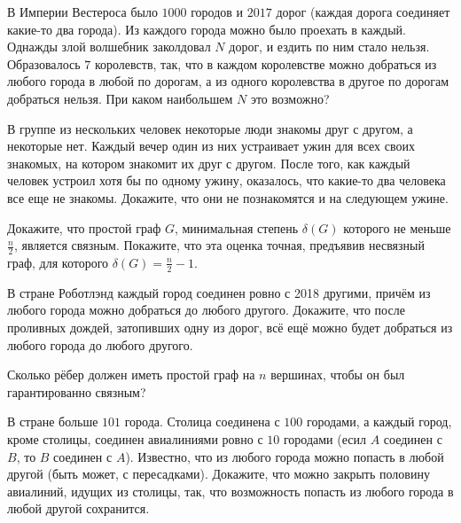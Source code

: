 \begin{exersize}
	В Империи Вестероса было $1000$ городов и $2017$ дорог (каждая дорога соединяет какие-то два города). Из каждого города можно 
	было проехать в каждый. Однажды злой волшебник заколдовал $N$ дорог, и ездить по ним стало нельзя. Образовалось $7$ королевств, 
	так, что в каждом королевстве можно добраться из любого города в любой по дорогам, а из одного королевства в другое по дорогам 
	добраться нельзя. При каком наибольшем $N$ это возможно?
\end{exersize}

\begin{exersize}
	В группе из нескольких человек некоторые люди знакомы друг с другом, а некоторые нет. Каждый вечер один из них устраивает 
	ужин для всех своих знакомых, на котором знакомит их друг с другом. После того, как каждый человек устроил хотя бы по одному ужину, 
	оказалось, что какие-то два человека все еще не знакомы. Докажите, что они не познакомятся и на следующем ужине.
\end{exersize}

\begin{exersize}
	Докажите, что простой граф $G$, минимальная степень $\delta (G)$ которого не меньше $\frac{n}{2}$, является связным. 
	Покажите, что эта оценка точная, предъявив несвязный граф, для которого $\delta (G) = \frac{n}{2} - 1$.
\end{exersize}

\begin{exersize}
	В стране Роботлэнд каждый город соединен ровно с 2018 другими, причём из любого города можно добраться до любого другого. 
	Докажите, что после проливных дождей, затопивших одну из дорог, всё ещё можно будет добраться из любого города до любого другого.
\end{exersize}

\begin{exersize}
	Сколько рёбер должен иметь простой граф на $n$ вершинах, чтобы он был гарантированно связным?
\end{exersize}

\begin{exersize}
	В стране больше $101$ города. Столица соединена с $100$ городами, а каждый город, кроме столицы, соединен авиалиниями ровно с 
	$10$ городами (есил $A$ соединен с $B$, то $B$ соединен с $A$). Известно, что из любого города можно попасть в любой другой 
	(быть может, с пересадками). Докажите, что можно закрыть половину авиалиний, идущих из столицы, так, что возможность попасть 
	из любого города в любой другой сохранится.
\end{exersize}

